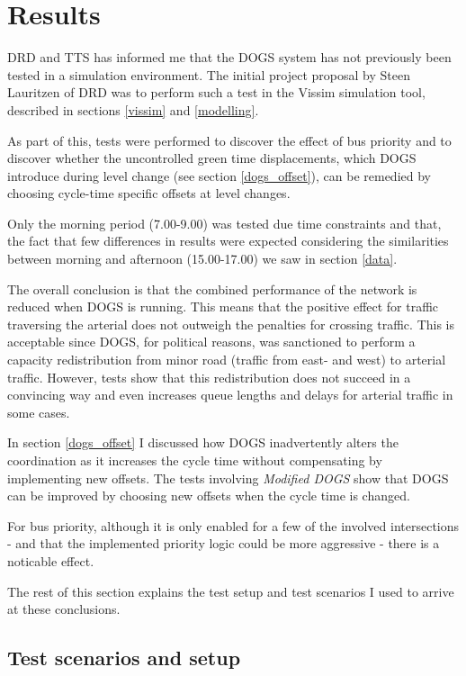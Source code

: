 \section{Results}
\label{test}
DRD and TTS has informed me that the DOGS system has not previously been tested in a simulation environment. The initial project proposal by Steen Lauritzen of DRD was to perform such a test in the Vissim simulation tool, described in sections \ref{vissim} and \ref{modelling}.

As part of this, tests were performed to discover the effect of bus priority and to discover whether the uncontrolled green time displacements, which DOGS introduce during level change (see section \ref{dogs_offset}), can be remedied by choosing cycle-time specific offsets at level changes.

Only the morning period (7.00-9.00) was tested due time constraints and that, the fact that few differences in results were expected considering the similarities between morning and afternoon (15.00-17.00) we saw in section \ref{data}.
 
The overall conclusion is that the combined performance of the network is reduced when DOGS is running. This means that the positive effect for traffic traversing the arterial does not outweigh the penalties for crossing traffic. 
This is acceptable since DOGS, for political reasons, was sanctioned to perform a capacity redistribution from minor road (traffic from east- and west) to arterial traffic. However, tests show that this redistribution does not succeed in a convincing way and even increases queue lengths and delays for arterial traffic in some cases.

In section \ref{dogs_offset} I discussed how DOGS inadvertently alters the coordination as it increases the cycle time without compensating by implementing new offsets. The tests involving \textit{Modified DOGS} show that DOGS can be improved by choosing new offsets when the cycle time is changed.

For bus priority, although it is only enabled for a few of the involved intersections - and that the implemented priority logic could be more aggressive - there is a noticable effect.

The rest of this section explains the test setup and test scenarios I used to arrive at these conclusions. 

\subsection{Test scenarios and setup}

